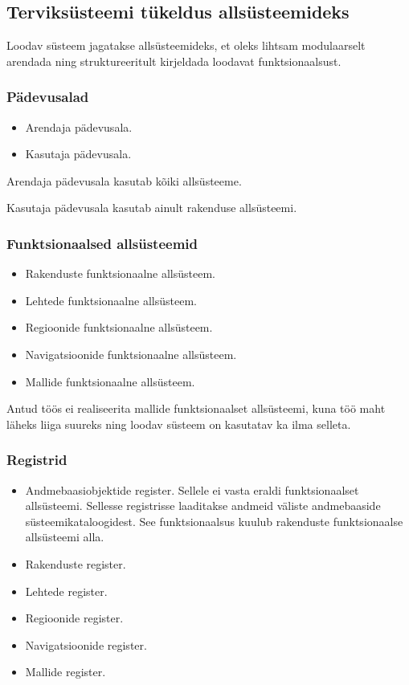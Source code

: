 \documentclass[a4paper,12pt]{article} %
\begin{document}
\subsection{Terviksüsteemi tükeldus allsüsteemideks}
Loodav süsteem jagatakse allsüsteemideks, et oleks lihtsam modulaarselt arendada ning struktureeritult kirjeldada loodavat funktsionaalsust.
\subsubsection{Pädevusalad}
\begin{itemize}
\item Arendaja pädevusala.
\item Kasutaja pädevusala.
\end{itemize}
Arendaja pädevusala kasutab kõiki allsüsteeme.\par
Kasutaja pädevusala kasutab ainult rakenduse allsüsteemi.
\subsubsection{Funktsionaalsed allsüsteemid}
\begin{itemize}
\item Rakenduste funktsionaalne allsüsteem.
\item Lehtede funktsionaalne allsüsteem.
\item Regioonide funktsionaalne allsüsteem.
\item Navigatsioonide funktsionaalne allsüsteem.
\item Mallide funktsionaalne allsüsteem.
\end{itemize}
Antud töös ei realiseerita mallide funktsionaalset allsüsteemi, kuna töö maht läheks liiga suureks ning loodav süsteem on kasutatav ka ilma selleta.
\subsubsection{Registrid}
\begin{itemize}
\item Andmebaasiobjektide register. Sellele ei vasta eraldi funktsionaalset allsüsteemi. Sellesse registrisse laaditakse andmeid väliste andmebaaside süsteemikataloogidest. See funktsionaalsus kuulub rakenduste funktsionaalse allsüsteemi alla.
\item Rakenduste register.
\item Lehtede register.
\item Regioonide register.
\item Navigatsioonide register.
\item Mallide register.
\end{itemize}
\end{document}
